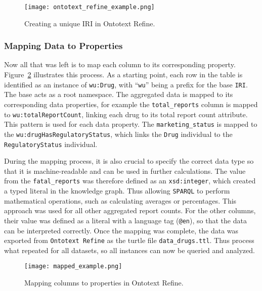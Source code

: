 \begin{figure}[H]
\centering
\texttt{[image: ontotext\_refine\_example.png]} %
\caption{Creating a unique IRI in Ontotext Refine.}
\label{fig:iri_creation}
\end{figure}

\subsubsection*{Mapping Data to Properties}
Now all that was left is to map each column to its corresponding property. Figure~\ref{fig:mapping_process} illustrates this process. As a starting point, each row in the table is identified as an instance of \texttt{wu:Drug}, with “\texttt{wu}” being a prefix for the base \texttt{IRI}. The base acts as a root namespace. The aggregated data is mapped to its corresponding data properties, for example the \texttt{total\_reports} column is mapped to \texttt{wu:total\-Report\-Count}, linking each drug to its total report count attribute. This pattern is used for each data property. The \texttt{marketing\_status} is mapped to the \texttt{wu:drug\-Has\-Regulatory\-Status}, which links the \texttt{Drug} individual to the \texttt{Regulatory\-Status} individual.

During the mapping process, it is also crucial to specify the correct data type so that it is machine-readable and can be used in further calculations. The value from the \texttt{fatal\_reports} was therefore defined as an \texttt{xsd:integer}, which created a typed literal in the knowledge graph. Thus allowing \texttt{SPARQL} to perform mathematical operations, such as calculating averages or percentages. This approach was used for all other aggregated report counts. For the other columns, their value was defined as a literal with a language tag (\texttt{@en}),  so that the data can be interpreted correctly.
Once the mapping was complete, the data was exported from \texttt{Ontotext Refine} as the turtle file \nolinkurl{data_drugs.ttl}. Thus process what repeated for all datasets, so all instances can now be queried and analyzed.

\begin{figure}[H]
\centering
\texttt{[image: mapped\_example.png]} %
\caption{Mapping columns to properties in Ontotext Refine.}
\label{fig:mapping_process}
\end{figure}

